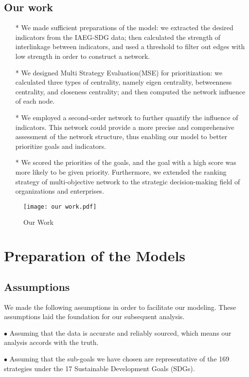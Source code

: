 \documentclass[12pt]{article}  %
\begin{document}
\subsection{Our work}
\begin{itemize}
    \item[*] We made sufficient preparations of the model: we extracted the desired indicators from the IAEG-SDG data; then calculated the strength of interlinkage between indicators, and used a threshold to filter out edges with low strength in order to construct a network.
    \item[*] We designed Multi Strategy Evaluation(MSE) for prioritization: we calculated three types of centrality, namely eigen centrality, betweenness centrality, and closeness centrality; and then computed the network influence of each node.
    \item[*] 
We employed a second-order network to further quantify the influence of indicators. This network could provide a more precise and comprehensive assessment of the network structure, thus enabling our model to better prioritize goals and indicators.
\item[*] 
We scored the priorities of the goals, and the goal with a high score was more likely to be given priority. Furthermore, we extended the ranking strategy of multi-objective network to the strategic decision-making field of organizations and enterprises.
\end{itemize}
\begin{figure}[htbp]
\centering
\texttt{[image: our work.pdf]}
\caption{Our Work}\label{fig:result}
\end{figure}

\section{Preparation of the Models}
\subsection{Assumptions}
We made the following assumptions  in order to facilitate our modeling.  These assumptions laid the foundation for our subsequent analysis.

 $\bullet$ Assuming that the data is accurate and reliably sourced, which  means our analysis
accords with the truth.

 $\bullet$ Assuming that the sub-goals we have chosen are representative of the 169 strategies under the 17 Sustainable Development Goals (SDGs).
\end{document}
